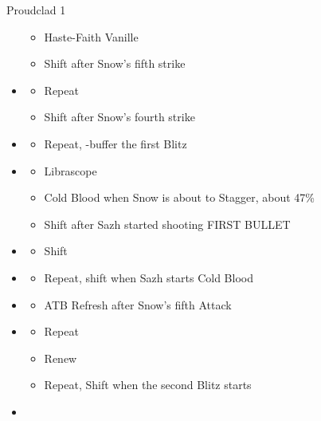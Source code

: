 \begin{paracol}{2}
\begin{battle}{Proudclad 1}
\begin{itemize}
\begin{itemize}
			      \item Haste-Faith Vanille
			      \item Shift after Snow's fifth strike
		      \end{itemize}
		\item \sixth
		      \begin{itemize}
			      \item Repeat
			      \item Shift after Snow's fourth strike
		      \end{itemize}
		\item \first
		      \begin{itemize}
			      \item Repeat, \rav-buffer the first Blitz
		      \end{itemize}
		\item \fifth
		      \begin{itemize}
			      \item Librascope
			      \item Cold Blood when Snow is about to Stagger, about 47\%
			      \item Shift after Sazh started shooting FIRST BULLET
		      \end{itemize}
		\item \sixth
		      \begin{itemize}
			      \item Shift
		      \end{itemize}
		\item \fifth
		      \begin{itemize}
			      \item Repeat, shift when Sazh starts Cold Blood
		      \end{itemize}
		\item \first
		      \begin{itemize}
			      \item ATB Refresh after Snow's fifth Attack
		      \end{itemize}
		\item \second
		      \begin{itemize}
			      \item Repeat
			      \item Renew
			      \item Repeat, Shift when the second Blitz starts
		      \end{itemize}
		\item \first
		      \begin{itemize}

\end{itemize}
\end{itemize}
\end{battle}
\end{paracol}
